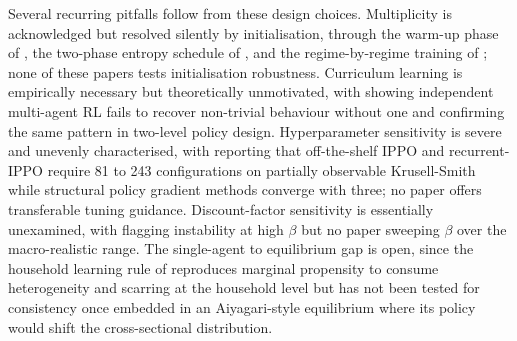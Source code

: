 Several recurring pitfalls follow from these design choices.
Multiplicity is acknowledged but resolved silently by initialisation,
through the warm-up phase of \citet{Yang2025srl}, the two-phase
entropy schedule of \citet{Zheng2022aie}, and the regime-by-regime
training of \citet{Chen2021drl}; none of these papers tests
initialisation robustness. Curriculum learning is empirically
necessary but theoretically unmotivated, with \citet{Curry2022marl}
showing independent multi-agent RL fails to recover non-trivial
behaviour without one and \citet{Zheng2022aie} confirming the same
pattern in two-level policy design. Hyperparameter sensitivity is
severe and unevenly characterised, with \citet{Wibault2026rspg}
reporting that off-the-shelf IPPO and recurrent-IPPO require 81 to
243 configurations on partially observable Krusell-Smith while
structural policy gradient methods converge with three; no paper
offers transferable tuning guidance. Discount-factor sensitivity is
essentially unexamined, with \citet{Atashbar2023imf} flagging
instability at high $\beta$ but no paper sweeping $\beta$ over the
macro-realistic range. The single-agent to equilibrium gap is open,
since the household learning rule of \citet{Kaplowitz2025}
reproduces marginal propensity to consume heterogeneity and
scarring at the household level but has not been tested for
consistency once embedded in an Aiyagari-style equilibrium where
its policy would shift the cross-sectional distribution.

